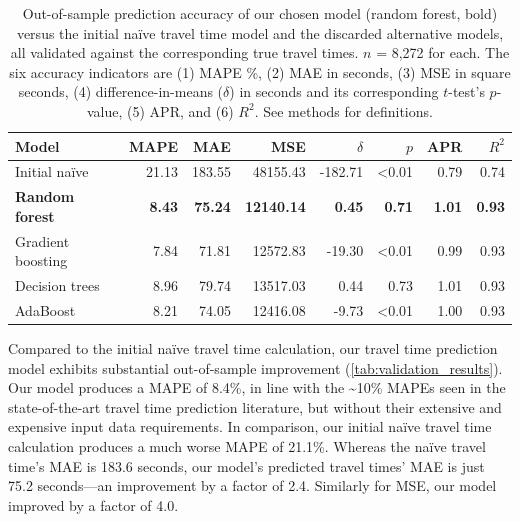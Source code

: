 \documentclass[12pt,letterpaper]{article} %
\begin{document}
\begin{table}[tb!]
    \centering\small
    \caption{Out-of-sample prediction accuracy of our chosen model (random forest, bold) versus the initial naïve travel time model and the discarded alternative models, all validated against the corresponding true travel times. $n$ = 8,272 for each. The six accuracy indicators are (1) MAPE \%, (2) MAE in seconds, (3) MSE in square seconds, (4) difference-in-means ($\delta$) in seconds and its corresponding $t$-test's $p$-value, (5) APR, and (6) $R^2$. See methods for definitions.}\label{tab:validation_results}
    \begin{tabular}{lrrrrrrr}
        \toprule
        Model               & MAPE  & MAE    & MSE      & $\delta$ & $p$  & APR  & $R^2$ \\
        \midrule
        Initial naïve       & 21.13 & 183.55 & 48155.43 &  -182.71 & <0.01 & 0.79 & 0.74  \\
        \textbf{Random forest}       &  \textbf{8.43} &  \textbf{75.24} & \textbf{12140.14} &     \textbf{0.45} &  \textbf{0.71} & \textbf{1.01} & \textbf{0.93}  \\
        Gradient boosting   &  7.84 &  71.81 & 12572.83 &   -19.30 & <0.01 & 0.99 & 0.93  \\
        Decision trees      &  8.96 &  79.74 & 13517.03 &     0.44 &  0.73 & 1.01 & 0.93  \\
        AdaBoost            &  8.21 &  74.05 & 12416.08 &    -9.73 & <0.01 & 1.00 & 0.93  \\
        \bottomrule
    \end{tabular}
\end{table}

Compared to the initial naïve travel time calculation, our travel time prediction model exhibits substantial out-of-sample improvement (\autoref{tab:validation_results}). Our model produces a MAPE of 8.4\%, in line with the \textasciitilde10\% MAPEs seen in the state-of-the-art travel time prediction literature, but without their extensive and expensive input data requirements. In comparison, our initial naïve travel time calculation produces a much worse MAPE of 21.1\%. Whereas the naïve travel time's MAE is 183.6 seconds, our model's predicted travel times' MAE is just 75.2 seconds---an improvement by a factor of 2.4. Similarly for MSE, our model improved by a factor of 4.0.
\end{document}
